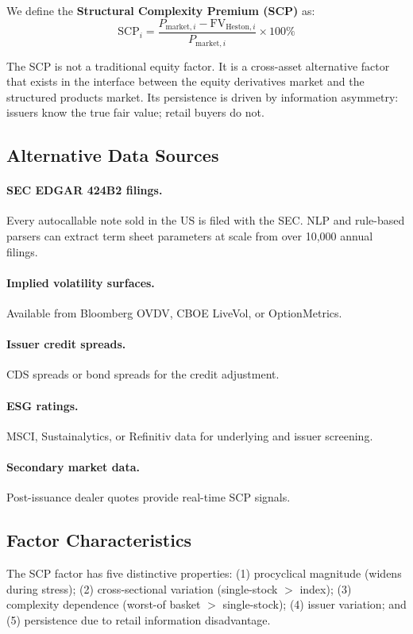 \documentclass[12pt,a4paper]{article}
\begin{document}
We define the \textbf{Structural Complexity Premium (SCP)} as:
\begin{equation}
    \text{SCP}_i = \frac{P_{\text{market},i} - \text{FV}_{\text{Heston},i}}{P_{\text{market},i}} \times 100\%
\end{equation}

The SCP is not a traditional equity factor. It is a cross-asset alternative factor that exists in the interface between the equity derivatives market and the structured products market. Its persistence is driven by information asymmetry: issuers know the true fair value; retail buyers do not.

\subsection{Alternative Data Sources}

\paragraph{SEC EDGAR 424B2 filings.} Every autocallable note sold in the US is filed with the SEC. NLP and rule-based parsers can extract term sheet parameters at scale from over 10,000 annual filings.
\paragraph{Implied volatility surfaces.} Available from Bloomberg OVDV, CBOE LiveVol, or OptionMetrics.
\paragraph{Issuer credit spreads.} CDS spreads or bond spreads for the credit adjustment.
\paragraph{ESG ratings.} MSCI, Sustainalytics, or Refinitiv data for underlying and issuer screening.
\paragraph{Secondary market data.} Post-issuance dealer quotes provide real-time SCP signals.

\subsection{Factor Characteristics}

The SCP factor has five distinctive properties: (1) procyclical magnitude (widens during stress); (2) cross-sectional variation (single-stock $>$ index); (3) complexity dependence (worst-of basket $>$ single-stock); (4) issuer variation; and (5) persistence due to retail information disadvantage.
\end{document}

